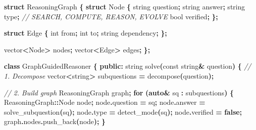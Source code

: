 \documentclass[
  11pt,
  a4paper,
]{article}
\newenvironment{Shaded}{\begin{snugshade}}{\end{snugshade}}
\newcommand{\AttributeTok}[1]{\textcolor[rgb]{0.13,0.29,0.53}{#1}}
\newcommand{\CommentTok}[1]{\textcolor[rgb]{0.56,0.35,0.01}{\textit{#1}}}
\newcommand{\ControlFlowTok}[1]{\textcolor[rgb]{0.13,0.29,0.53}{\textbf{#1}}}
\newcommand{\DataTypeTok}[1]{\textcolor[rgb]{0.13,0.29,0.53}{#1}}
\newcommand{\KeywordTok}[1]{\textcolor[rgb]{0.13,0.29,0.53}{\textbf{#1}}}
\newcommand{\NormalTok}[1]{#1}
\newcommand{\OperatorTok}[1]{\textcolor[rgb]{0.81,0.36,0.00}{\textbf{#1}}}
\begin{document}
\begin{Shaded}
\begin{Highlighting}[]
\KeywordTok{struct}\NormalTok{ ReasoningGraph }\OperatorTok{\{}
    \KeywordTok{struct}\NormalTok{ Node }\OperatorTok{\{}
\NormalTok{        string question}\OperatorTok{;}
\NormalTok{        string answer}\OperatorTok{;}
\NormalTok{        string type}\OperatorTok{;}  \CommentTok{// SEARCH, COMPUTE, REASON, EVOLVE}
        \DataTypeTok{bool}\NormalTok{ verified}\OperatorTok{;}
    \OperatorTok{\};}
    
    \KeywordTok{struct}\NormalTok{ Edge }\OperatorTok{\{}
        \DataTypeTok{int}\NormalTok{ from}\OperatorTok{;}
        \DataTypeTok{int}\NormalTok{ to}\OperatorTok{;}
\NormalTok{        string dependency}\OperatorTok{;}
    \OperatorTok{\};}
    
\NormalTok{    vector}\OperatorTok{\textless{}}\NormalTok{Node}\OperatorTok{\textgreater{}}\NormalTok{ nodes}\OperatorTok{;}
\NormalTok{    vector}\OperatorTok{\textless{}}\NormalTok{Edge}\OperatorTok{\textgreater{}}\NormalTok{ edges}\OperatorTok{;}
\OperatorTok{\};}

\KeywordTok{class}\NormalTok{ GraphGuidedReasoner }\OperatorTok{\{}
\KeywordTok{public}\OperatorTok{:}
\NormalTok{    string solve}\OperatorTok{(}\AttributeTok{const}\NormalTok{ string}\OperatorTok{\&}\NormalTok{ question}\OperatorTok{)} \OperatorTok{\{}
        \CommentTok{// 1. Decompose}
\NormalTok{        vector}\OperatorTok{\textless{}}\NormalTok{string}\OperatorTok{\textgreater{}}\NormalTok{ subquestions }\OperatorTok{=}\NormalTok{ decompose}\OperatorTok{(}\NormalTok{question}\OperatorTok{);}
        
        \CommentTok{// 2. Build graph}
\NormalTok{        ReasoningGraph graph}\OperatorTok{;}
        \ControlFlowTok{for} \OperatorTok{(}\KeywordTok{auto}\OperatorTok{\&}\NormalTok{ sq }\OperatorTok{:}\NormalTok{ subquestions}\OperatorTok{)} \OperatorTok{\{}
\NormalTok{            ReasoningGraph}\OperatorTok{::}\NormalTok{Node node}\OperatorTok{;}
\NormalTok{            node}\OperatorTok{.}\NormalTok{question }\OperatorTok{=}\NormalTok{ sq}\OperatorTok{;}
\NormalTok{            node}\OperatorTok{.}\NormalTok{answer }\OperatorTok{=}\NormalTok{ solve\_subquestion}\OperatorTok{(}\NormalTok{sq}\OperatorTok{);}
\NormalTok{            node}\OperatorTok{.}\NormalTok{type }\OperatorTok{=}\NormalTok{ detect\_mode}\OperatorTok{(}\NormalTok{sq}\OperatorTok{);}
\NormalTok{            node}\OperatorTok{.}\NormalTok{verified }\OperatorTok{=} \KeywordTok{false}\OperatorTok{;}
\NormalTok{            graph}\OperatorTok{.}\NormalTok{nodes}\OperatorTok{.}\NormalTok{push\_back}\OperatorTok{(}\NormalTok{node}\OperatorTok{);}
        \OperatorTok{\}}
        

\end{Highlighting}
\end{Shaded}
\end{document}
